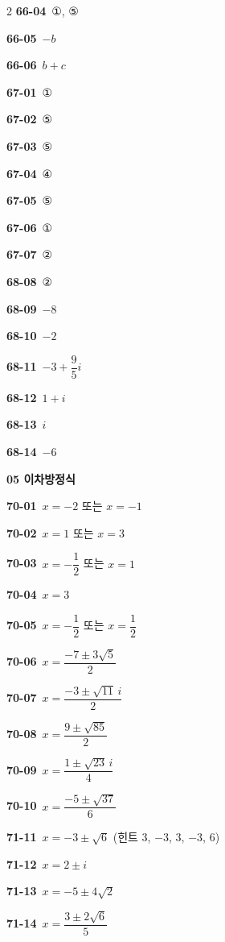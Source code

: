\documentclass[10pt,a4paper]{article}
\begin{document}
\begin{multicols}{2}
\noindent\textbf{66-04}\ ①, ⑤\par
\noindent\textbf{66-05}\ $-b$\par
\noindent\textbf{66-06}\ $b+c$\par
\noindent\textbf{67-01}\ ①\par
\noindent\textbf{67-02}\ ⑤\par
\noindent\textbf{67-03}\ ⑤\par
\noindent\textbf{67-04}\ ④\par
\noindent\textbf{67-05}\ ⑤\par
\noindent\textbf{67-06}\ ①\par
\noindent\textbf{67-07}\ ②\par
\noindent\textbf{68-08}\ ②\par
\noindent\textbf{68-09}\ $-8$\par
\noindent\textbf{68-10}\ $-2$\par
\noindent\textbf{68-11}\ $-3+\dfrac{9}{5}i$\par
\noindent\textbf{68-12}\ $1+i$\par
\noindent\textbf{68-13}\ $i$\par
\noindent\textbf{68-14}\ $-6$\par
\noindent\textbf{05 이차방정식}\par\smallskip
\noindent\textbf{70-01}\ $x=-2$ 또는 $x=-1$\par
\noindent\textbf{70-02}\ $x=1$ 또는 $x=3$\par
\noindent\textbf{70-03}\ $x=-\dfrac{1}{2}$ 또는 $x=1$\par
\noindent\textbf{70-04}\ $x=3$\par
\noindent\textbf{70-05}\ $x=-\dfrac{1}{2}$ 또는 $x=\dfrac{1}{2}$\par
\noindent\textbf{70-06}\ $x=\dfrac{-7\pm3\sqrt{5}}{2}$\par
\noindent\textbf{70-07}\ $x=\dfrac{-3\pm\sqrt{11}\,i}{2}$\par
\noindent\textbf{70-08}\ $x=\dfrac{9\pm\sqrt{85}}{2}$\par
\noindent\textbf{70-09}\ $x=\dfrac{1\pm\sqrt{23}\,i}{4}$\par
\noindent\textbf{70-10}\ $x=\dfrac{-5\pm\sqrt{37}}{6}$\par
\noindent\textbf{71-11}\ $x=-3\pm\sqrt{6}$ (힌트 $3$, $-3$, $3$, $-3$, $6$)\par
\noindent\textbf{71-12}\ $x=2\pm i$\par
\noindent\textbf{71-13}\ $x=-5\pm4\sqrt{2}$\par
\noindent\textbf{71-14}\ $x=\dfrac{3\pm2\sqrt{6}}{5}$\par

\end{multicols}
\end{document}
